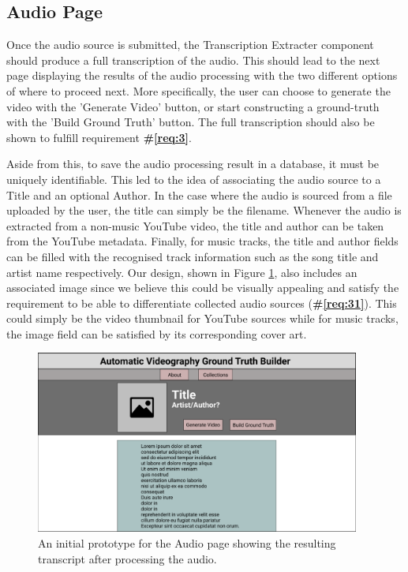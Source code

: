 \documentclass{l4proj}
\begin{document}
\subsection{Audio Page}
Once the audio source is submitted, the Transcription Extracter component should produce a full transcription of the audio. This should lead to the next page displaying the results of the audio processing with the two different options of where to proceed next. More specifically, the user can choose to generate the video with the 'Generate Video' button, or start constructing a ground-truth with the 'Build Ground Truth' button. The full transcription should also be shown to fulfill requirement \textbf{\#\ref{req:3}}. 

Aside from this, to save the audio processing result in a database, it must be uniquely identifiable. This led to the idea of associating the audio source to a Title and an optional Author. In the case where the audio is sourced from a file uploaded by the user, the title can simply be the filename. Whenever the audio is extracted from a non-music YouTube video, the title and author can be taken from the YouTube metadata. Finally, for music tracks, the title and author fields can be filled with the recognised track information such as the song title and artist name respectively. Our design, shown in Figure \ref{fig:audio_page}, also includes an associated image since we believe this could be visually appealing and satisfy the requirement to be able to differentiate collected audio sources (\textbf{\#\ref{req:31}}). This could simply be the video thumbnail for YouTube sources while for music tracks, the image field can be satisfied by its corresponding cover art. 

\begin{figure}
    \centering
    \includegraphics[width=0.95\textwidth]{figures/audio_page.pdf}
    \caption{An initial prototype for the Audio page showing the resulting transcript after processing the audio.}
    \label{fig:audio_page}
\end{figure}
\end{document}
